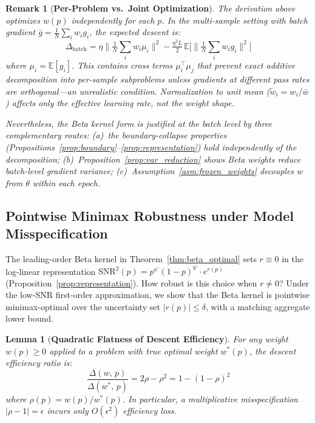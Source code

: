 \documentclass{article}
\newtheorem{lemma}[theorem]{Lemma}
\newtheorem{remark}{Remark}
\begin{document}
\begin{remark}[\textbf{Per-Problem vs.\ Joint Optimization}]
\label{rem:per_problem_vs_joint}
The derivation above optimizes $w(p)$ independently for each $p$. In the multi-sample setting with batch gradient $\bar{g} = \frac{1}{N}\sum_i w_i g_i$, the expected descent is:
\begin{equation}
  \Delta_{\text{batch}} = \eta\Big\|\tfrac{1}{N}\textstyle\sum_i w_i \mu_i\Big\|^2 - \tfrac{\eta^2 L}{2}\,\mathbb{E}\Big[\Big\|\tfrac{1}{N}\textstyle\sum_i w_i g_i\Big\|^2\Big]
\end{equation}
where $\mu_i = \mathbb{E}[g_i]$. This contains cross terms $\mu_i^\top \mu_j$ that prevent exact additive decomposition into per-sample subproblems unless gradients at different pass rates are orthogonal---an unrealistic condition. Normalization to unit mean ($\tilde{w}_i = w_i/\bar{w}$) affects only the effective learning rate, not the weight shape.

Nevertheless, the Beta kernel form is justified at the batch level by three complementary routes: (a)~the boundary-collapse properties (Propositions~\ref{prop:boundary}--\ref{prop:representation}) hold independently of the decomposition; (b)~Proposition~\ref{prop:var_reduction} shows Beta weights reduce batch-level gradient variance; (c)~Assumption~\ref{asm:frozen_weights} decouples $w$ from $\theta$ within each epoch.
\end{remark}

\subsection{Pointwise Minimax Robustness under Model Misspecification}
\label{app:proof_minimax}

The leading-order Beta kernel in Theorem~\ref{thm:beta_optimal} sets $r \equiv 0$ in the log-linear representation $\text{SNR}^2(p) = p^{a'}(1-p)^{b'}\cdot e^{r(p)}$ (Proposition~\ref{prop:representation}). How robust is this choice when $r \neq 0$? Under the low-SNR first-order approximation, we show that the Beta kernel is pointwise minimax-optimal over the uncertainty set $|r(p)| \leq \delta$, with a matching aggregate lower bound.

\begin{lemma}[\textbf{Quadratic Flatness of Descent Efficiency}]
\label{lem:quadratic_flat}
For any weight $w(p) \geq 0$ applied to a problem with true optimal weight $w^*(p)$, the descent efficiency ratio is:
\begin{equation}
  \frac{\Delta(w,\,p)}{\Delta(w^*,\,p)} = 2\rho - \rho^2 = 1 - (1 - \rho)^2
\end{equation}
where $\rho(p) = w(p)/w^*(p)$. In particular, a multiplicative misspecification $|\rho - 1| = \epsilon$ incurs only $O(\epsilon^2)$ efficiency loss.
\end{lemma}
\end{document}
